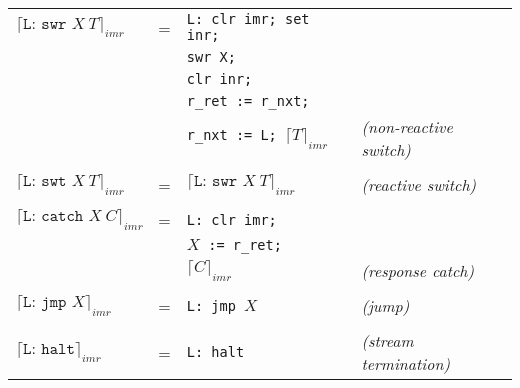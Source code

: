 \documentclass{article}
\newcommand{\compile}[2]{\lceil #2 \rceil_{#1}}
\begin{document}
\begin{tabular}[t]{llll}
\\
$\compile{imr}{\texttt{L: swr }X\ T}$ &=& \texttt{L: clr imr; set inr;}\\
&&\texttt{swr X;}\\
&&\texttt{clr inr;}\\
&&\texttt{r\_ret := r\_nxt;}\\
&&\texttt{r\_nxt := L; }$\compile{imr}{T}$&\emph{(non-reactive switch)}\\
\\
$\compile{imr}{\texttt{L: swt }X\ T}$ &=& $\compile{imr}{\texttt{L: swr }X\ T}$&\emph{(reactive switch)}\\
\\
$\compile{imr}{\texttt{L: catch }X\ C}$ &=& \texttt{L: clr imr;}\\
&&$X$\texttt{ := r\_ret;}\\
&&$\compile{imr}{C}$&\emph{(response catch)}\\
\\
$\compile{imr}{\texttt{L: jmp }X}$ &=& \texttt{L: jmp }$X$&\emph{(jump)}\\
\\
$\compile{imr}{\texttt{L: halt}}$ &=& \texttt{L: halt}&\emph{(stream termination)}\\

\end{tabular}
\end{document}
